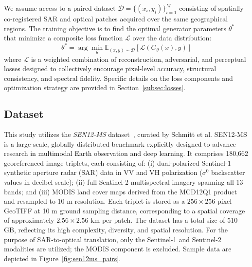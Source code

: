 \documentclass[remotesensing,article,submit,pdftex,moreauthors]{Definitions/mdpi}
\begin{document}
We assume access to a paired dataset $\mathcal{D} = \{(x_i, y_i)\}_{i=1}^{M}$ consisting of spatially co-registered SAR and optical patches acquired over the same geographical regions. The training objective is to find the optimal generator parameters $\theta^*$ that minimize a composite loss function $\mathcal{L}$ over the data distribution:
\begin{equation}
    \theta^* = \arg\min_{\theta} \mathbb{E}_{(x,y) \sim \mathcal{D}} [\mathcal{L}(G_{\theta}(x), y)]
\end{equation}
where $\mathcal{L}$ is a weighted combination of reconstruction, adversarial, and perceptual losses designed to collectively encourage pixel-level accuracy, structural consistency, and spectral fidelity. Specific details on the loss components and optimization strategy are provided in Section~\ref{subsec:losses}.

\subsection{Dataset}
\label{sec:datasets}

This study utilizes the \textit{SEN12-MS} dataset~\cite{sen12ms_2019}, curated by Schmitt et al. SEN12-MS is a large-scale, globally distributed benchmark explicitly designed to advance research in multimodal Earth observation and deep learning. It comprises 180,662 georeferenced image triplets, each consisting of: (i) dual-polarized Sentinel-1 synthetic aperture radar (SAR) data in VV and VH polarization ($\sigma^{0}$ backscatter values in decibel scale); (ii) full Sentinel-2 multispectral imagery spanning all 13 bands; and (iii) MODIS land cover maps derived from the MCD12Q1 product and resampled to 10 m resolution. Each triplet is stored as a $256 \times 256$ pixel GeoTIFF at 10 m ground sampling distance, corresponding to a spatial coverage of approximately $2.56 \times 2.56$ km per patch. The dataset has a total size of 510 GB, reflecting its high complexity, diversity, and spatial resolution. For the purpose of SAR-to-optical translation, only the Sentinel-1 and Sentinel-2 modalities are utilized; the MODIS component is excluded. Sample data are depicted in Figure~\ref{fig:sen12ms_pairs}.
\end{document}
